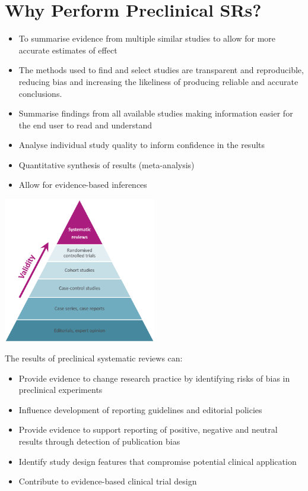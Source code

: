 \documentclass[
]{book}
\providecommand{\tightlist}{%
  \setlength{\itemsep}{0pt}\setlength{\parskip}{0pt}}
\begin{document}
\hypertarget{why-perform-preclinical-srs}{%
\section{Why Perform Preclinical SRs?}\label{why-perform-preclinical-srs}}

\begin{itemize}
\tightlist
\item
  To summarise evidence from multiple similar studies to allow for more accurate estimates of effect
\item
  The methods used to find and select studies are transparent and reproducible, reducing bias and increasing the likeliness of producing reliable and accurate conclusions.
\item
  Summarise findings from all available studies making information easier for the end user to read and understand
\item
  Analyse individual study quality to inform confidence in the results
\item
  Quantitative synthesis of results (meta-analysis)
\item
  Allow for evidence-based inferences
\end{itemize}

\includegraphics[width=0.5\textwidth,height=0.5\textheight]{figs/evidence-triangle.png}

The results of preclinical systematic reviews can:

\begin{itemize}
\tightlist
\item
  Provide evidence to change research practice by identifying risks of bias in preclinical experiments
\item
  Influence development of reporting guidelines and editorial policies
\item
  Provide evidence to support reporting of positive, negative and neutral results through detection of publication bias
\item
  Identify study design features that compromise potential clinical application
\item
  Contribute to evidence-based clinical trial design
\end{itemize}
\end{document}
